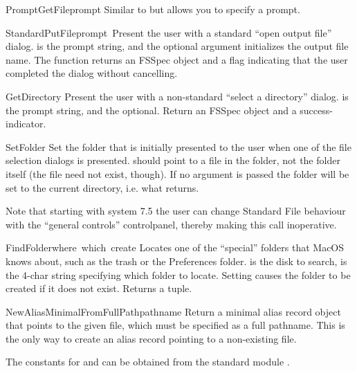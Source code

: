 \begin{funcdesc}{PromptGetFile}{prompt}
Similar to  but allows you to specify a prompt.
\end{funcdesc}

\begin{funcdesc}{StandardPutFile}{prompt\, }
Present the user with a standard ``open output file''
dialog.  is the prompt string, and the optional
 argument initializes the output file name. The function
returns an FSSpec object and a flag indicating that the user completed
the dialog without cancelling.
\end{funcdesc}

\begin{funcdesc}{GetDirectory}{}
Present the user with a non-standard ``select a directory''
dialog.  is the prompt string, and the optional.
Return an FSSpec object and a success-indicator.
\end{funcdesc}

\begin{funcdesc}{SetFolder}{}
Set the folder that is initially presented to the user when one of
the file selection dialogs is presented.  should point to
a file in the folder, not the folder itself (the file need not exist,
though). If no argument is passed the folder will be set to the
current directory, i.e. what  returns.

Note that starting with system 7.5 the user can change Standard File
behaviour with the ``general controls'' controlpanel, thereby making
this call inoperative.
\end{funcdesc}

\begin{funcdesc}{FindFolder}{where\, which\, create}
Locates one of the ``special'' folders that MacOS knows about, such as
the trash or the Preferences folder.  is the disk to
search,  is the 4-char string specifying which folder to
locate. Setting  causes the folder to be created if it
does not exist. Returns a  tuple.
\end{funcdesc}

\begin{funcdesc}{NewAliasMinimalFromFullPath}{pathname}
Return a minimal alias record object that points to the given file, which
must be specified as a full pathname. This is the only way to create an
alias record pointing to a non-existing file.

The constants for  and  can be obtained from the
standard module .
\end{funcdesc}

